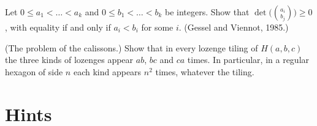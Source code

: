 \begin{exercise}[$\star\star$]\label{linear:ex:vandermondelgv}
Let $0\le a_1<\dots<a_k$ and $0\le b_1<\dots<b_k$ be integers. Show that $\det\bigl(\binom{a_i}{b_j}\bigr)\ge0$, with equality
if and only if $a_i<b_i$ for some $i$. (Gessel and Viennot, 1985.)
\end{exercise}

\begin{exercise}[$\star\star$]\label{linear:ex:calisson}
(The problem of the calissons.) Show that in every lozenge tiling of $H(a,b,c)$ the three kinds of lozenges appear $ab$,
$bc$ and $ca$ times. In particular, in a regular hexagon of side $n$ each kind appears $n^2$ times, whatever the tiling.
\end{exercise}

\section{Hints}

